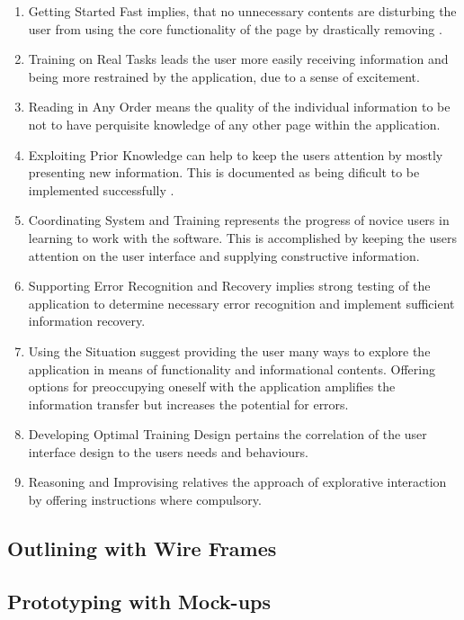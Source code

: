 \begin{enumerate}
\item{Getting Started Fast} implies, that no unnecessary contents are disturbing the user from using the core functionality of the page by drastically removing   \parencite{Bakar.2017}.
\item{Training on Real Tasks} leads the user more easily receiving information and being more restrained by the application, due to a sense of excitement.
\item{Reading in Any Order} means the quality of the individual information to be not to have perquisite knowledge of any other page within the application.
\item{Exploiting Prior Knowledge} can help to keep the users attention by mostly presenting new information. This is documented as being dificult to be implemented successfully .
\item{Coordinating System and Training} represents the progress of novice users in learning to work with the software. This is accomplished by keeping the users attention on the user interface and supplying constructive information.
\item{Supporting Error Recognition and Recovery} implies strong testing of the application to determine necessary error recognition and implement sufficient information recovery.
\item{Using the Situation} suggest providing the user many ways to explore the application in means of functionality and informational contents. Offering options for preoccupying oneself with the application amplifies the information transfer but increases the potential for errors.
\item{Developing Optimal Training Design} pertains the correlation of the user interface design to the users needs and behaviours. 
\item{Reasoning and Improvising} relatives the approach of explorative interaction by offering instructions where compulsory.
\end{enumerate}


\subsection{Outlining with Wire Frames}


\subsection{Prototyping with Mock-ups}